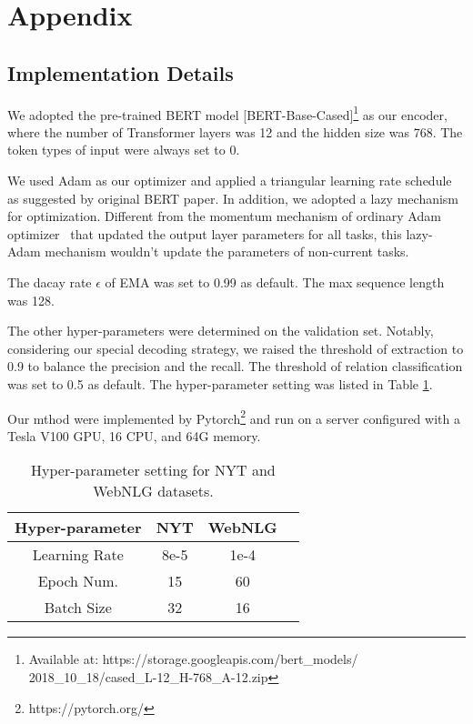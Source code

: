 \documentclass[11pt,a4paper]{article}
\begin{document}



\clearpage
\section{Appendix}
\subsection{Implementation Details}\label{ass:id}
We adopted the pre-trained BERT model [BERT-Base-Cased]\footnote{Available at: https://storage.googleapis.com/bert\_models/\\2018\_10\_18/cased\_L-12\_H-768\_A-12.zip} as our encoder, where the number of Transformer layers was 12 and the hidden size was 768. The token types of input were always set to 0. 

We used Adam as our optimizer and applied a triangular learning rate schedule as suggested by original BERT paper. In addition, we adopted a lazy mechanism for optimization. Different from the momentum mechanism of ordinary Adam optimizer~\cite{kingma2015adam} that updated the output layer parameters for all tasks, this lazy-Adam mechanism wouldn't update the parameters of non-current tasks. 

The dacay rate $\epsilon$ of EMA was set to 0.99 as default. The max sequence length was 128.

The other hyper-parameters were determined on the validation set. Notably, considering our special decoding strategy, we raised the threshold of extraction to 0.9 to balance the precision and the recall. The threshold of relation classification was set to 0.5 as default. The hyper-parameter setting was listed in Table \ref{table:res_hyperpara_appendix}. 

Our mthod were implemented by Pytorch\footnote{https://pytorch.org/} and run on a server configured with a Tesla V100 GPU, 16 CPU, and 64G memory.

\begin{table}[htbp]
\centering
\begin{tabular}{c|ccc}
\toprule[1pt]
Hyper-parameter & NYT & WebNLG \\
\hline
Learning Rate & 8e-5 & 1e-4 \\
Epoch Num. & 15 & 60 \\
Batch Size & 32 & 16 \\
\bottomrule[1pt]
\end{tabular}
\caption{Hyper-parameter setting for NYT and WebNLG datasets. }
\label{table:res_hyperpara_appendix}
\end{table}
\end{document}
